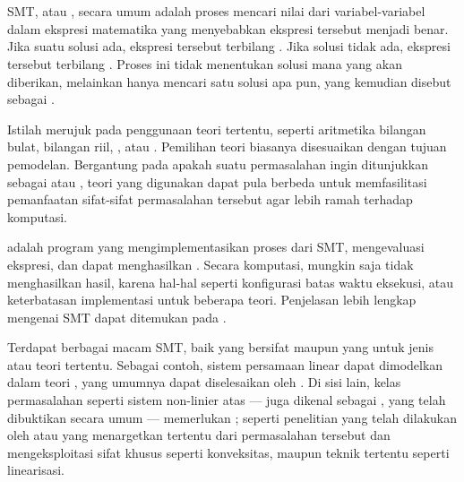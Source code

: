 \section{}

SMT, atau , secara umum adalah proses mencari nilai dari variabel-variabel dalam ekspresi matematika yang menyebabkan ekspresi tersebut menjadi benar. Jika suatu solusi ada, ekspresi tersebut terbilang . Jika solusi tidak ada, ekspresi tersebut terbilang . Proses ini tidak menentukan solusi mana yang akan diberikan, melainkan hanya mencari satu solusi apa pun, yang kemudian disebut sebagai .

Istilah  merujuk pada penggunaan teori tertentu, seperti aritmetika bilangan bulat, bilangan riil, , atau . Pemilihan teori biasanya disesuaikan dengan tujuan pemodelan. Bergantung pada apakah suatu permasalahan ingin ditunjukkan sebagai  atau , teori yang digunakan dapat pula berbeda untuk memfasilitasi pemanfaatan sifat-sifat permasalahan tersebut agar lebih ramah terhadap komputasi.

 adalah program yang mengimplementasikan proses dari SMT, mengevaluasi ekspresi, dan dapat menghasilkan . Secara komputasi,  mungkin saja tidak menghasilkan hasil, karena hal-hal seperti konfigurasi batas waktu eksekusi, atau keterbatasan implementasi untuk beberapa teori. Penjelasan lebih lengkap mengenai SMT dapat ditemukan pada \cite{barrett2018}.

Terdapat berbagai macam  SMT, baik yang bersifat  maupun yang  untuk jenis  atau teori tertentu. Sebagai contoh, sistem persamaan linear dapat dimodelkan dalam teori , yang umumnya dapat diselesaikan oleh . Di sisi lain, kelas permasalahan seperti sistem non-linier atas  --- juga dikenal sebagai , yang telah dibuktikan  secara umum \citep{matiiaasevich1993} --- memerlukan ; seperti penelitian yang telah dilakukan oleh \cite{nuzzo2010} atau \cite{borralleras2020} yang menargetkan  tertentu dari permasalahan tersebut dan mengeksploitasi sifat khusus seperti konveksitas, maupun teknik tertentu seperti linearisasi.

